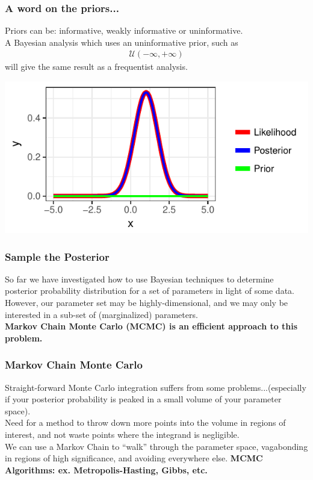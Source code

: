 \documentclass[handout]{beamer}\usepackage[]{graphicx}\usepackage[]{color}
\makeatletter
\def\maxwidth{ %
  \ifdim\Gin@nat@width>\linewidth
    \linewidth
  \else
    \Gin@nat@width
  \fi
}
\newenvironment{knitrout}{}{} %
\makeatother
\begin{document}
\begin{frame}
\frametitle{A word on the priors...}
\pause
Priors can be: informative, weakly informative or uninformative. \\
\pause
A Bayesian analysis which uses an uninformative prior, such as
\pause
\begin{align*}
\mathcal{U} \left( -\infty, +\infty \right)
\end{align*}
\pause
will give the same result as a frequentist analysis.

\begin{knitrout}
\color{fgcolor}
\includegraphics[width=\maxwidth]{figure/uniform-1} 

\end{knitrout}

\end{frame}


\begin{frame}
\frametitle{Sample the Posterior}

So far we have investigated how to use Bayesian techniques to determine posterior probability distribution for a set of parameters in light of some data. \\
\pause
However, our parameter set may be highly-dimensional, and we may only be interested in a sub-set of (marginalized) parameters. \\
\pause
\textbf{Markov Chain Monte Carlo (MCMC) is an efficient approach to this problem.}

\end{frame}


\begin{frame}
\frametitle{Markov Chain Monte Carlo}

Straight-forward Monte Carlo integration suffers from some problems...(especially if your posterior probability is peaked in a small volume of your parameter space).\\
\pause
Need for a method to throw down more points into the volume in regions of interest, and not waste points where the integrand is negligible. \\
\pause
We can use a Markov Chain to “walk” through the parameter space, vagabonding in regions of high significance, and avoiding everywhere else.
\pause
\textbf{MCMC Algorithms: ex. Metropolis-Hasting, Gibbs, etc.}
\end{frame}
\end{document}

